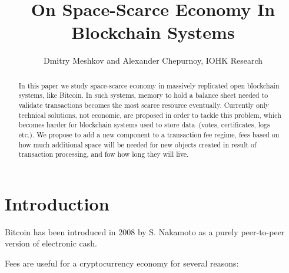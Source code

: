 \documentclass[]{article}   %
\newcommand{\authnote}[2]{\marginpar{\parbox{\marginparwidth}{\tiny %
  \textsf{#1 {\textcolor{blue}{notes: #2}}}}}%
  \textcolor{blue}{\textbf{\dag}}}
\newcommand{\authnote}[2]{
  \textsf{#1 \textcolor{blue}{: #2}}}
\newcommand{\authnote}[2]{}
\newcommand{\dnote}[1]{{\authnote{\textcolor{blue}{Dima notes}}{#1}}}
\newcommand{\ignore}[1]{} %
\begin{document}
\title{On Space-Scarce Economy In Blockchain Systems}
\author{Dmitry Meshkov and Alexander Chepurnoy, IOHK Research}
\maketitle

\begin{abstract}
In this paper we study space-scarce economy in massively replicated open blockchain systems, like Bitcoin. In such systems, memory to hold a balance sheet needed to validate transactions becomes the most scarce resource eventually. Currently only technical solutions, not economic, are proposed in order to tackle this problem, which becomes harder for blockchain systems used to store data~(votes, certificates, logs etc.). We propose to add a new component to a transaction fee regime, fees based on how much additional space will be needed for new objects created in result of transaction processing, and fow how long they will live.    
\end{abstract}

\section{Introduction}

Bitcoin \cite{Nakamoto2008} has been introduced in 2008 by S. Nakamoto as a purely peer-to-peer version of electronic cash. 

\dnote{more words about bitcoin as an economy and a cryptocurrency economy}

\ignore{
  A cryptocurrency should satisfy at least 2 properties assuming an honest majority and arbitrary adversarial behavior~\cite{Garay2015}. \textit{Persistence} guarantees that once a transaction goes more than $k$ blocks "deep" into the blockchain of one honest player, then it will be included in every honest player's blockchain with overwhelming probability, and it will be assigned a permanent position in the ledger. \textit{Liveness} guarantees that all transactions originating from honest participants will eventually end up at a depth more than $k$ blocks in an honest player's blockchain, and hence the adversary cannot perform a selective denial of service attack against honest account holders.

  Bitcoin holds the \textit{liveness} property when honest miners are expected to be altruistic and so add transactions to blocks even if it is not profitable for them. 
}

Fees are useful for a cryptocurrency economy for several reasons:
\end{document}
